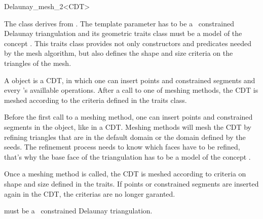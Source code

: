 \begin{ccRefClass}{Delaunay_mesh_2<CDT>}

The class \ccRefName{} derives from
. The template parameter
 has to be a \cgal\ constrained Delaunay triangulation and its
geometric traits class must be a model of the concept
. This traits class provides not only
constructors and predicates needed by the mesh algorithm, but also defines
the shape and size criteria on the triangles of the mesh.

A \ccRefName{} object is a  CDT, in which one can insert points
and constrained segments and every 's availlable operations. After
a call to one of meshing methods, the CDT is meshed according to the
criteria defined in the traits class.

Before the first call to a meshing method, one can insert points and
constrained segments in the \ccRefName{} object, like in a CDT. Meshing
methods will mesh the CDT by refining triangles that are in the default
domain or the domain defined by the seeds. The refinement process needs to
know which faces have to be refined, that's why the base face of the
triangulation  has to be a model of the concept
.

Once a meshing method is called, the CDT is meshed according to
criteria on shape and size defined in the traits. If points or
constrained segments are inserted again in the CDT, the criterias are
no longer garanted.



\ccInheritsFrom


\ccParameters

 must be a \cgal\ constrained Delaunay triangulation.

\ccTypes 
{}

\ccCreation
{}


\end{ccRefClass}
